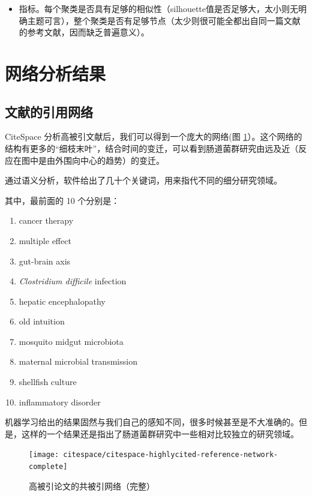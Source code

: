 \documentclass[]{ctexbook}
\providecommand{\tightlist}{%
  \setlength{\itemsep}{0pt}\setlength{\parskip}{0pt}}
\begin{document}
\begin{itemize}
\tightlist
\item
  指标。每个聚类是否具有足够的相似性（silhouette值是否足够大，太小则无明确主题可言），整个聚类是否有足够节点（太少则很可能全都出自同一篇文献的参考文献，因而缺乏普遍意义）。
\end{itemize}

\hypertarget{citespace-network-result}{%
\section{网络分析结果}\label{citespace-network-result}}

\hypertarget{ux6587ux732eux7684ux5f15ux7528ux7f51ux7edc-1}{%
\subsection{文献的引用网络}\label{ux6587ux732eux7684ux5f15ux7528ux7f51ux7edc-1}}

CiteSpace 分析高被引文献后，我们可以得到一个庞大的网络(图 \ref{fig:citespace-highlycited-reference-network-complete}）。这个网络的结构有更多的``细枝末叶''，结合时间的变迁，可以看到肠道菌群研究由远及近（反应在图中是由外围向中心的趋势）的变迁。

通过语义分析，软件给出了几十个关键词，用来指代不同的细分研究领域。

其中，最前面的 10 个分别是：

\begin{enumerate}
\def\labelenumi{\arabic{enumi}.}
\tightlist
\item
  cancer therapy
\item
  multiple effect
\item
  gut-brain axis
\item
  \emph{Clostridium difficile} infection
\item
  hepatic encephalopathy
\item
  old intuition
\item
  mosquito midgut microbiota
\item
  maternal microbial transmission
\item
  shellfish culture
\item
  inflammatory disorder
\end{enumerate}

机器学习给出的结果固然与我们自己的感知不同，很多时候甚至是不大准确的。但是，这样的一个结果还是指出了肠道菌群研究中一些相对比较独立的研究领域。

\begin{figure}
\texttt{[image: citespace/citespace-highlycited-reference-network-complete]} \caption{高被引论文的共被引网络（完整）}\label{fig:citespace-highlycited-reference-network-complete}
\end{figure}
\end{document}
